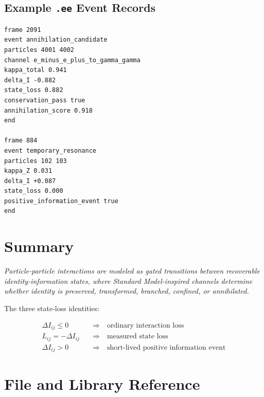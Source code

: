 \documentclass[11pt,a4paper]{article}
\theoremstyle{defbox}
\begin{document}
\subsection{Example \texttt{.ee} Event Records}

\begin{verbatim}
frame 2091
event annihilation_candidate
particles 4001 4002
channel e_minus_e_plus_to_gamma_gamma
kappa_total 0.941
delta_I -0.882
state_loss 0.882
conservation_pass true
annihilation_score 0.918
end

frame 884
event temporary_resonance
particles 102 103
kappa_Z 0.031
delta_I +0.087
state_loss 0.000
positive_information_event true
end
\end{verbatim}

\section{Summary}
\label{sec:summary}

\begin{center}
\setlength{\fboxsep}{10pt}
\colorbox{boxbg}{%
\begin{minipage}{0.88\textwidth}
\centering
\textit{Particle-particle interactions are modeled as gated transitions between
recoverable identity-information states, where Standard Model-inspired channels
determine whether identity is preserved, transformed, branched, confined, or
annihilated.}
\end{minipage}}
\end{center}

\bigskip

The three state-loss identities:

\begin{align}
  \Delta I_{ij} \leq 0 \quad&\Rightarrow\quad \text{ordinary interaction loss} \\
  L_{ij} = -\Delta I_{ij} \quad&\Rightarrow\quad \text{measured state loss} \\
  \Delta I_{ij} > 0 \quad&\Rightarrow\quad \text{short-lived positive information event}
\end{align}

\section{File and Library Reference}
\label{sec:files}
\end{document}

